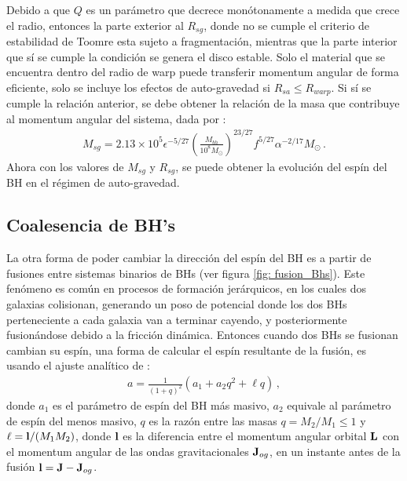 %
Debido a que $Q$ es un parámetro que decrece monótonamente a medida que crece el radio, entonces la parte exterior al $R_{sg}$, donde no se cumple el criterio de estabilidad de Toomre esta sujeto a fragmentación, mientras que la parte interior que sí se cumple la condición se genera el disco estable. Solo el material que se encuentra dentro del radio de warp puede transferir momentum angular de forma eficiente, solo se incluye los efectos de auto-gravedad si $R_{sa}\leq R_{warp}$. Si sí se cumple la relación anterior, se debe obtener la relación de la masa que contribuye al momentum angular del sistema, dada por \cite{fanidakis2011}:
%
\begin{align}
    M_{sg} = 2.13\times 10^{5}\epsilon^{-5/27}\left(\frac{M_{bh}}{10^{8}M_{\odot}} \right)^{23/27}f^{5/27}\alpha^{-2/17}M_{\odot}\,.
\end{align}
%
Ahora con los valores de $M_{sg}$ y $R_{sg}$, se puede obtener la evolución del espín del BH en el régimen de auto-gravedad.


\subsection{Coalesencia de BH's}
\label{subsec:fusion_BHs}
La otra forma de poder cambiar la dirección del espín del BH es a partir de fusiones entre  sistemas binarios de BHs (ver figura \ref{fig: fusion_Bhs}). Este fenómeno es común en procesos de formación jerárquicos, en los cuales dos galaxias colisionan, generando un poso de potencial donde los dos BHs perteneciente a cada galaxia van a terminar cayendo, y posteriormente fusionándose debido a la fricción dinámica. Entonces cuando dos BHs se fusionan cambian su espín, una forma de calcular el espín resultante de la fusión, es usando el ajuste analítico de \cite{rezzolla2008}: 
%
\begin{align}
    a = \frac{1}{(1+q)^{2}}(a_{1}+a_{2}q^{2}+\ell q)\,,
\end{align}
%
donde $a_{1}$ es el parámetro de espín del BH más masivo, $a_{2}$ equivale al parámetro de espín del menos masivo, $q$ es la razón entre las masas $q=M_{2}/M_{1}\leq 1$ y $ {\bf{\ell}} = {\bf{l}}/(M_{1}M_{2})$, donde ${\bf{l}}$ es la diferencia entre el momentum angular orbital ${\bf{L}}$ con el momentum angular de las ondas gravitacionales ${\bf{J}}_{og}$, en un instante antes de la fusión ${\bf{l}}={\bf{J}}-{\bf{J}}_{og}$.

